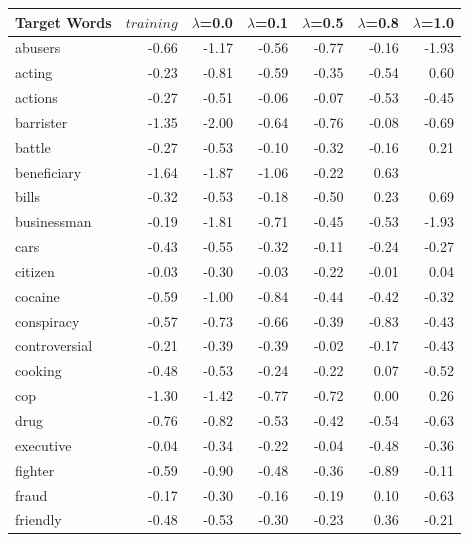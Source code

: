 \documentclass[11pt,a4paper]{article}
\begin{document}
\begin{table}[t]
\small
\centering
    \begin{tabular}{|l|r|r|r|r|r|r|}
     \toprule
     
    \textbf{Target Words}  & \textbf{$training$} & \textbf{$\lambda$}{=0.0}  & \textbf{$\lambda$}{=0.1}& \textbf{$\lambda$}{=0.5} & \textbf{$\lambda$}{=0.8} & \textbf{$\lambda$}{=1.0}   \\
      \midrule

abusers         & -0.66 & -1.17 & -0.56 & -0.77 & -0.16 & -1.93 \\
acting          & -0.23 & -0.81 & -0.59 & -0.35 & -0.54 & 0.60  \\
actions         & -0.27 & -0.51 & -0.06 & -0.07 & -0.53 & -0.45 \\
barrister       & -1.35 & -2.00 & -0.64 & -0.76 & -0.08 & -0.69 \\
battle          & -0.27 & -0.53 & -0.10 & -0.32 & -0.16 & 0.21  \\
beneficiary     & -1.64 & -1.87 & -1.06 & -0.22 & 0.63  &       \\
bills           & -0.32 & -0.53 & -0.18 & -0.50 & 0.23  & 0.69  \\
businessman     & -0.19 & -1.81 & -0.71 & -0.45 & -0.53 & -1.93 \\
cars            & -0.43 & -0.55 & -0.32 & -0.11 & -0.24 & -0.27 \\
citizen         & -0.03 & -0.30 & -0.03 & -0.22 & -0.01 & 0.04  \\
cocaine         & -0.59 & -1.00 & -0.84 & -0.44 & -0.42 & -0.32 \\
conspiracy      & -0.57 & -0.73 & -0.66 & -0.39 & -0.83 & -0.43 \\
controversial   & -0.21 & -0.39 & -0.39 & -0.02 & -0.17 & -0.43 \\
cooking         & -0.48 & -0.53 & -0.24 & -0.22 & 0.07  & -0.52 \\
cop             & -1.30 & -1.42 & -0.77 & -0.72 & 0.00  & 0.26  \\
drug            & -0.76 & -0.82 & -0.53 & -0.42 & -0.54 & -0.63 \\
executive       & -0.04 & -0.34 & -0.22 & -0.04 & -0.48 & -0.36 \\
fighter         & -0.59 & -0.90 & -0.48 & -0.36 & -0.89 & -0.11 \\
fraud           & -0.17 & -0.30 & -0.16 & -0.19 & 0.10  & -0.63 \\
friendly        & -0.48 & -0.53 & -0.30 & -0.23 & 0.36  & -0.21 \\

\end{tabular}
\end{table}
\end{document}
